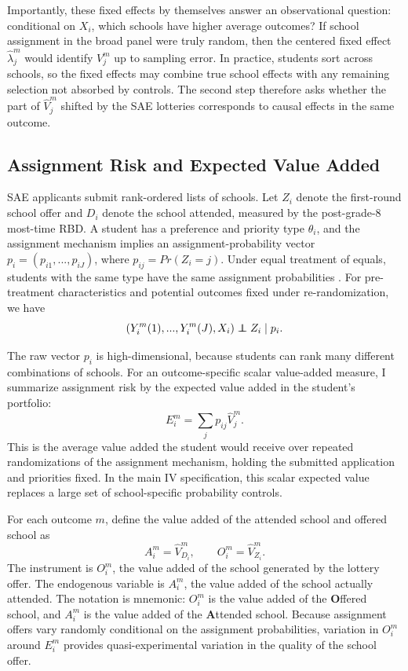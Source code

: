 \documentclass[a4paper, article, english, oneside, unknownkeysallowed, 12pt]{memoir}
\begin{document}
Importantly, these fixed effects by themselves answer an observational question: conditional on $X_i$, which schools have higher average outcomes?
If school assignment in the broad panel were truly random, then the centered fixed effect $\widehat{\lambda}_j^m$ would identify $V_j^m$ up to sampling error.
In practice, students sort across schools, so the fixed effects may combine true school effects with any remaining selection not absorbed by controls.
The second step therefore asks whether the part of $\widehat{V}_j^m$ shifted by the SAE lotteries corresponds to causal effects in the same outcome.


\subsection{Assignment Risk and Expected Value Added}

SAE applicants submit rank-ordered lists of schools.
Let $Z_i$ denote the first-round school offer and $D_i$ denote the school attended, measured by the post-grade-8 most-time RBD.
A student has a preference and priority type $\theta_i$, and the assignment mechanism implies an assignment-probability vector $p_i=(p_{i1},...,p_{iJ})$, where $p_{ij}=Pr(Z_i=j)$.
Under equal treatment of equals, students with the same type have the same assignment probabilities \parencite{abdulkadiroglu_research_2017}.
For pre-treatment characteristics and potential outcomes fixed under re-randomization, we have
\begin{equation}
  (Y_i^m(1),...,Y_i^m(J), X_i) \perp\!\!\!\!\perp Z_i \mid p_i.
  \label{eq:offer-independence}
\end{equation}

The raw vector $p_i$ is high-dimensional, because students can rank many different combinations of schools.
For an outcome-specific scalar value-added measure, I summarize assignment risk by the expected value added in the student's portfolio:
\begin{equation}
  E_i^m = \sum_j p_{ij}\widehat{V}_j^m.
  \label{eq:expected-va}
\end{equation}
This is the average value added the student would receive over repeated randomizations of the assignment mechanism, holding the submitted application and priorities fixed.
In the main IV specification, this scalar expected value replaces a large set of school-specific probability controls.

For each outcome $m$, define the value added of the attended school and offered school as
\begin{equation}
  A_i^m = \widehat{V}_{D_i}^m,
  \qquad
  O_i^m = \widehat{V}_{Z_i}^m.
  \label{eq:attended-offered-va}
\end{equation}
The instrument is $O_i^m$, the value added of the school generated by the lottery offer.
The endogenous variable is $A_i^m$, the value added of the school actually attended.
The notation is mnemonic: $O_i^m$ is the value added of the \textbf{O}ffered school, and $A_i^m$ is the value added of the \textbf{A}ttended school.
Because assignment offers vary randomly conditional on the assignment probabilities, variation in $O_i^m$ around $E_i^m$ provides quasi-experimental variation in the quality of the school offer.
\end{document}
